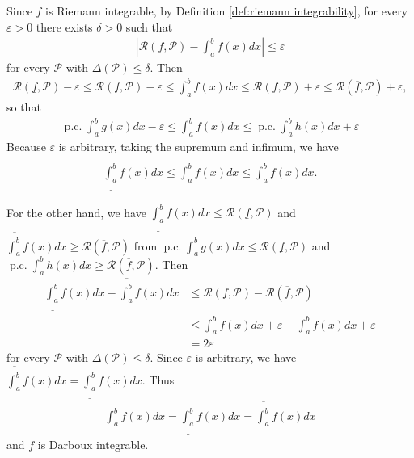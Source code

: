 \documentclass{book}
\theoremstyle{defstyle}
\theoremstyle{thmstyle}
\DeclareMathOperator{\PiecewiseConstant}{p.c.}
\newcommand{\pcint}{\PiecewiseConstant\int}
\begin{document}
Since $f$ is Riemann integrable, by Definition \ref{def:riemann integrability}, for every $\varepsilon > 0$ there exists $\delta > 0$ such that
    \begin{align*}
        \left|\mathcal{R}(f, \mathcal{P}) - \int_{a}^{b}f(x)dx\right|\leq \varepsilon
    \end{align*}
for every $\mathcal{P}$ with $\Delta(\mathcal{P}) \leq \delta$. Then
    \begin{align*}
        \mathcal{R}(\underline{f}, \mathcal{P}) - \varepsilon
        \leq \mathcal{R}(f, \mathcal{P}) - \varepsilon
        \leq \int_{a}^{b}f(x)dx
        \leq \mathcal{R}(f, \mathcal{P}) + \varepsilon
        \leq \mathcal{R}(\overline{f}, \mathcal{P}) + \varepsilon,
    \end{align*}
so that
    \begin{align*}
        \pcint_{a}^{b}g(x)dx - \varepsilon
        \leq \int_{a}^{b}f(x)dx
        \leq \pcint_{a}^{b}h(x)dx + \varepsilon
    \end{align*}
Because $\varepsilon$ is arbitrary, taking the supremum and infimum, we have
    \begin{align*}
        \underline{\int_{a}^{b}}f(x)dx
        \leq \int_{a}^{b}f(x)dx
        \leq \overline{\int_{a}^{b}}f(x)dx.
    \end{align*}

For the other hand, we have $\underline{\int_{a}^{b}}f(x)dx \leq \mathcal{R}(\underline{f}, \mathcal{P})$ and $\overline{\int_{a}^{b}}f(x)dx \geq \mathcal{R}(\overline{f}, \mathcal{P})$ from $\pcint_{a}^{b}g(x)dx \leq \mathcal{R}(\underline{f}, \mathcal{P})$ and $\pcint_{a}^{b}h(x)dx \geq \mathcal{R}(\overline{f}, \mathcal{P})$. Then
    \begin{align*}
        \underline{\int_{a}^{b}}f(x)dx - \overline{\int_{a}^{b}}f(x)dx
        &\leq \mathcal{R}(\underline{f}, \mathcal{P}) - \mathcal{R}(\overline{f}, \mathcal{P})\\
        &\leq \int_{a}^{b}f(x)dx + \varepsilon
            - \int_{a}^{b}f(x)dx + \varepsilon\\
        &= 2\varepsilon
    \end{align*}
for every $\mathcal{P}$ with $\Delta(\mathcal{P}) \leq \delta$. Since $\varepsilon$ is arbitrary, we have $\overline{\int_{a}^{b}}f(x)dx = \underline{\int_{a}^{b}}f(x)dx$. Thus
\begin{align*}
    \int_{a}^{b}f(x)dx = \underline{\int_{a}^{b}}f(x)dx =\overline{\int_{a}^{b}}f(x)dx
\end{align*}
and $f$ is Darboux integrable.
\end{document}
